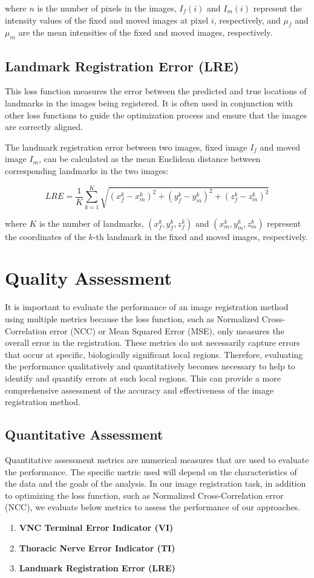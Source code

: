 \documentclass{book}
\begin{document}
	where $n$ is the number of pixels in the images, $I_f(i)$ and $I_m(i)$ represent the intensity values of the fixed and moved images at pixel $i$, respectively, and $\mu_f$ and $\mu_m$ are the mean intensities of the fixed and moved images, respectively.
	
	\subsection{Landmark Registration Error (LRE)}
	This loss function measures the error between the predicted and true locations of landmarks in the images being registered. It is often used in conjunction with other loss functions to guide the optimization process and ensure that the images are correctly aligned.
	
	The landmark registration error between two images, fixed image $I_f$ and moved image $I_m$, can be calculated as the mean Euclidean distance between corresponding landmarks in the two images:
	
	$$ LRE = \frac{1}{K} \sum_{k=1}^K \sqrt{(x_f^k - x_m^k)^2 + (y_f^k - y_m^k)^2 + (z_f^k - z_m^k)^2} $$
	
	where $K$ is the number of landmarks, $(x_f^k, y_f^k, z_f^k)$ and $(x_m^k, y_m^k, z_m^k)$ represent the coordinates of the $k$-th landmark in the fixed and moved images, respectively.
	
	\section{Quality Assessment}\label{sec:quality}
	It is important to evaluate the performance of an image registration method using multiple metrics because the loss function, such as Normalized Cross-Correlation error (NCC) or Mean Squared Error (MSE), only measures the overall error in the registration. These metrics do not necessarily capture errors that occur at specific, biologically significant local regions. Therefore, evaluating the performance qualitatively and quantitatively becomes necessary to help to identify and quantify errors at such local regions. This can provide a more comprehensive assessment of the accuracy and effectiveness of the image registration method.
	
	\subsection{Quantitative Assessment} \label{subsec:quantitative}
	Quantitative assessment metrics are numerical measures that are used to evaluate the performance. The specific metric used will depend on the characteristics of the data and the goals of the analysis. In our image registration task, in addition to optimizing the loss function, such as Normalized Cross-Correlation error (NCC), we  evaluate below metrics to assess the performance of our approaches.
	\begin{enumerate}
		\item \textbf{VNC Terminal Error Indicator (VI)}
		\item \textbf{Thoracic Nerve Error Indicator (TI)}
		\item \textbf{Landmark Registration Error (LRE)}
	\end{enumerate}
\end{document}

